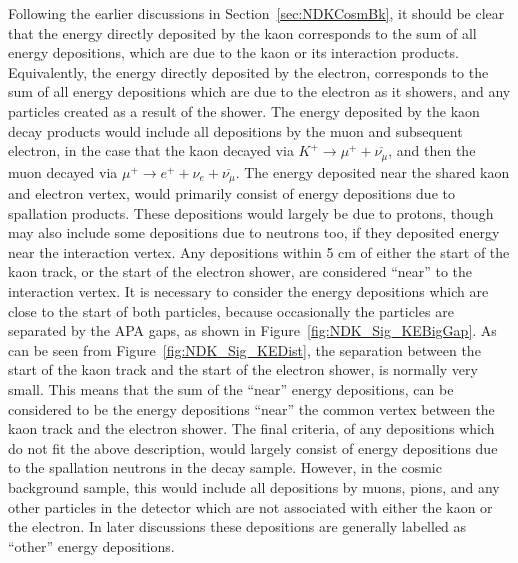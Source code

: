 Following the earlier discussions in Section~\ref{sec:NDKCosmBk}, it should be clear that the energy directly deposited by the kaon corresponds to the sum of all energy depositions, which are due to the kaon or its interaction products. Equivalently, the energy directly deposited by the electron, corresponds to the sum of all energy depositions which are due to the electron as it showers, and any particles created as a result of the shower. The energy deposited by the kaon decay products would include all depositions by the muon and subsequent electron, in the case that the kaon decayed via $K^{+} \rightarrow \mu^{+} + \overline{\nu_{\mu}}$, and then the muon decayed via $\mu^{+} \rightarrow e^{+} + \nu_{e} + \overline{\nu_{\mu}}$. The energy deposited near the shared kaon and electron vertex, would primarily consist of energy depositions due to spallation products. These depositions would largely be due to protons, though may also include some depositions due to neutrons too, if they deposited energy near the interaction vertex. Any depositions within 5 cm of either the start of the kaon track, or the start of the electron shower, are considered ``near'' to the interaction vertex. It is necessary to consider the energy depositions which are close to the start of both particles, because occasionally the particles are separated by the APA gaps, as shown in Figure~\ref{fig:NDK_Sig_KEBigGap}. As can be seen from Figure~\ref{fig:NDK_Sig_KEDist}, the separation between the start of the kaon track and the start of the electron shower, is normally very small. This means that the sum of the ``near'' energy depositions, can be considered to be the energy depositions ``near'' the common vertex between the kaon track and the electron shower. The final criteria, of any depositions which do not fit the above description, would largely consist of energy depositions due to the spallation neutrons in the decay sample. However, in the cosmic background sample, this would include all depositions by muons, pions, and any other particles in the detector which are not associated with either the kaon or the electron. In later discussions these depositions are generally labelled as ``other'' energy depositions. \\

